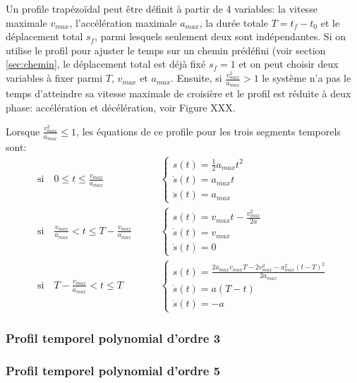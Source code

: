 Un profile trapézoïdal peut être définit à partir de 4 variables: la vitesse maximale $v_{max}$, l'accélération maximale $a_{max}$, la durée totale $T=t_f-t_0$ et le déplacement total $s_f$, parmi lesquels seulement deux sont indépendantes. Si on utilise le profil pour ajuster le temps sur un chemin prédéfini (voir section \ref{sec:chemin}, le déplacement total est déjà fixé $s_f=1$ et on peut choisir deux variables à fixer parmi $T$, $v_{max}$ et $a_{max}$. Ensuite, si $\frac{v_{max}^2}{a_{max}} > 1$ le système n'a pas le temps d'atteindre sa vitesse maximale de croisière et le profil est réduite à deux phase: accélération et décélération, voir Figure XXX.

Lorsque $\frac{v_{max}^2}{a_{max}} \leq 1$, les équations de ce profile pour les trois segments temporels sont:
\begin{align}
\text{si} \quad 0 \leq t \leq \frac{v_{max}}{a_{max}} \quad & \quad \left\{ \begin{array}{l}
s(t)= \frac{1}{2} a_{max} t^2
\\
\dot{s}(t)= a_{max} t
\\
\ddot{s}(t) = a_{max}
\end{array}
\right. \\
\text{si} \quad \frac{v_{max}}{a_{max}} < t \leq T- \frac{v_{max}}{a_{max}} \quad & \quad \left\{ \begin{array}{l}
s(t)= v_{max} t -  \frac{v_{max}^2}{2a}
\\
\dot{s}(t)= v_{max}
\\
\ddot{s}(t) = 0
\end{array}
\right. \\
\text{si} \quad  T- \frac{v_{max}}{a_{max}}  < t \leq T \quad & \quad \left\{ \begin{array}{l}
s(t) = \frac{2 a_{max} v_{max} T - 2 v_{max}^2 - a_{max}^2(t-T)^2}{2 a_{max}}
\\
\dot{s}(t)= a(T - t)
\\
\ddot{s}(t) = -a
\end{array}
\right.
\end{align}

\subsubsection{Profil temporel polynomial d'ordre 3}

\subsubsection{Profil temporel polynomial d'ordre 5}



